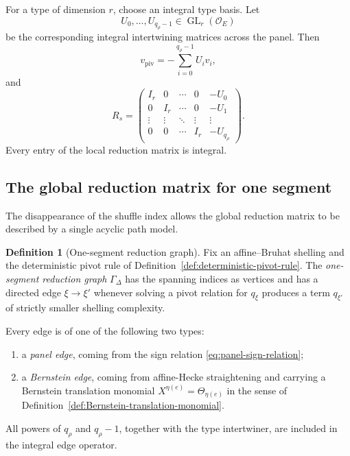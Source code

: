 \documentclass[12pt]{article}
\theoremstyle{definition}
\newtheorem{definition}[theorem]{Definition}
\theoremstyle{remark}
\newcommand{\Ocoeff}{\mathcal O_E}
\DeclareMathOperator{\GL}{GL}
\begin{document}
For a type of dimension \(r\), choose an integral type basis.  Let
\[
 U_0,\ldots,U_{q_\rho-1}\in\GL_r(\Ocoeff)
\]
be the corresponding integral intertwining matrices across the panel.
Then
\[
 v_{\mathrm{piv}}
 =
 -\sum_{i=0}^{q_\rho-1}U_iv_i,
\]
and
\begin{equation}\label{eq:local-R-type}
R_s=
\begin{pmatrix}
	I_r & 0 & \cdots & 0 & -U_0\\
	0 & I_r & \cdots & 0  & -U_1\\
	\vdots & \vdots & \ddots & \vdots & \vdots \\
	0 & 0 & \cdots & I_r & -U_{q_{\rho}}
\end{pmatrix}.
\end{equation}
Every entry of the local reduction matrix is integral.

\subsection{The global reduction matrix for one segment}

The disappearance of the shuffle index allows the global reduction matrix to
be described by a single acyclic path model.

\begin{definition}[One-segment reduction graph]
\label{def:one-segment-reduction-graph}
Fix an affine--Bruhat shelling and the deterministic pivot rule of
Definition~\ref{def:deterministic-pivot-rule}.  The
\emph{one-segment reduction graph}
\(\Gamma_\Delta\) has the spanning indices as vertices and has a directed
edge \(\xi\to\xi'\) whenever solving a pivot relation for \(q_\xi\) produces
a term \(q_{\xi'}\) of strictly smaller shelling complexity.

Every edge is of one of the following two types:
\begin{enumerate}
 \item a \emph{panel edge}, coming from the sign relation
 \eqref{eq:panel-sign-relation};
 \item a \emph{Bernstein edge}, coming from affine-Hecke straightening and
 carrying a Bernstein translation monomial
 \(X^{\eta(e)}=\Theta_{\eta(e)}\) in the sense of
 Definition~\ref{def:Bernstein-translation-monomial}.
\end{enumerate}
All powers of \(q_\rho\) and \(q_\rho-1\), together with the type
intertwiner, are included in the integral edge operator.
\end{definition}
\end{document}
